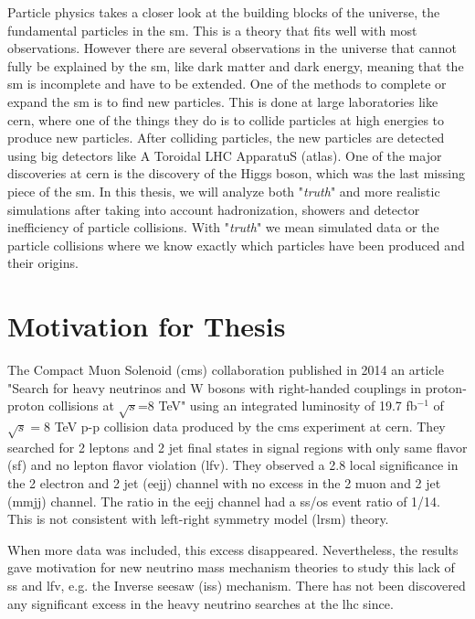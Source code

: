 \documentclass[a4paper, american, 12pt]{report}
\begin{document}
	Particle physics takes a closer look at the building blocks of the universe, the fundamental particles in the \acrshort{sm}. This is a theory that fits well with most observations. However there are several observations in the universe that cannot fully be explained by the \acrshort{sm}, like dark matter and dark energy, meaning that the \acrshort{sm} is incomplete and have to be extended. One of the methods to complete or expand the \acrshort{sm} is to find new particles. This is done at large laboratories like \acrshort{cern}, where one of the things they do is to collide particles at high energies to produce new particles. After colliding particles, the new particles are detected using big detectors like A Toroidal LHC ApparatuS (\acrshort{atlas}). One of the major discoveries at \acrshort{cern} is the discovery of the Higgs boson\cite{HiggsATLAS}\cite{HiggsCMS}, which was the last missing piece of the \acrshort{sm}. In this thesis, we will analyze both "\textit{truth}" and more realistic simulations after taking into account hadronization, showers and detector inefficiency of particle collisions. With "\textit{truth}" we mean simulated data or the particle collisions where we know exactly which particles have been produced and their origins.
	
	
	\section{Motivation for Thesis}
	\label{sect:Intro-MotivThesis}
	The Compact Muon Solenoid (\acrshort{cms}) collaboration published in 2014 an article "Search for heavy neutrinos and W bosons with
	right-handed couplings in proton-proton collisions at $\sqrt{s}$=8 TeV"\cite{mymodel2} using an integrated luminosity of 19.7 fb$^{-1}$ of $\sqrt{s} = 8$ TeV p-p collision data produced by the \acrshort{cms} experiment at \acrshort{cern}. They searched for 2 leptons and 2 jet final states in signal regions with only same flavor (\acrshort{sf}) and no lepton flavor violation (\acrshort{lfv}). They observed a 2.8 local significance in the 2 electron and 2 jet (eejj) channel with no excess in the 2 muon and 2 jet (mmjj) channel. The ratio in the eejj channel had a \acrshort{ss}/\acrshort{os} event ratio of 1/14. This is not consistent with left-right symmetry model (\acrshort{lrsm}) theory.
	
	When more data was included, this excess disappeared. Nevertheless, the results gave motivation for new neutrino mass mechanism theories to study this lack of \acrshort{ss} and \acrshort{lfv}, e.g. the Inverse seesaw (\acrshort{iss}) mechanism\cite{inverseseesaw}. There has not been discovered any significant excess in the heavy neutrino searches at the \acrshort{lhc} since. 
	
\end{document}
